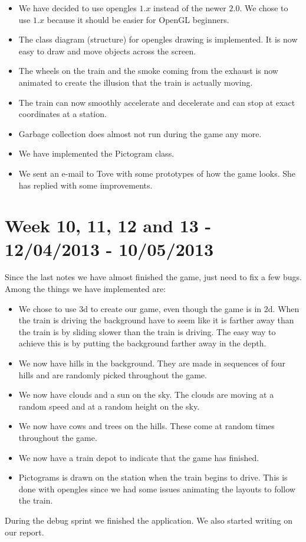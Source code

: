 \begin{itemize}
\item We have decided to use \ac{opengles} $1.x$ instead of the newer $2.0$. We chose to use $1.x$ because it should be easier for OpenGL beginners. 
\item The class diagram (structure) for \ac{opengles} drawing is implemented. It is now easy to draw and move objects across the screen. 
\item The wheels on the train and the smoke coming from the exhaust is now animated to create the illusion that the train is actually moving. 
\item The train can now smoothly accelerate and decelerate and can stop at exact coordinates at a station. 
\item Garbage collection does almost not run during the game any more.
\item We have implemented the Pictogram class.
\item We sent an e-mail to Tove with some prototypes of how the game looks. She has replied with some improvements.
\end{itemize} 

\section*{Week 10, 11, 12 and 13 - 12/04/2013 - 10/05/2013}
Since the last notes we have almost finished the game, just need to fix a few bugs. Among the things we have implemented are:

\begin{itemize}
\item We chose to use \ac{3d} to create our game, even though the game is in \ac{2d}. When the train is driving the background have to seem like it is farther away than the train is by sliding slower than the train is driving. The easy way to achieve this is by putting the background farther away in the depth.
\item We now have hills in the background. They are made in sequences of four hills and are randomly picked throughout the game. 
\item We now have clouds and a sun on the sky. The clouds are moving at a random speed and at a random height on the sky. 
\item We now have cows and trees on the hills. These come at random times throughout the game.
\item We now have a train depot to indicate that the game has finished.
\item Pictograms is drawn on the station when the train begins to drive. This is done with \ac{opengles} since we had some issues animating the layouts to follow the train.  
\end{itemize}
During the debug sprint we finished the application. We also started writing on our report. 

